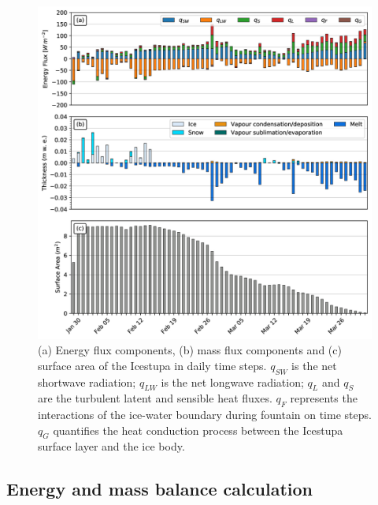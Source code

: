 \documentclass[utf8]{frontiersSCNS} %
\begin{document}
  \begin{figure} \begin{center}
  \includegraphics[width=\linewidth]{Figures/Figure_6.jpg} \end{center}
  \caption{(a) Energy flux components, (b) mass flux components and (c)
  surface area of the Icestupa in daily time steps. $q_{SW}$ is the net
shortwave radiation; $q_{LW}$ is the net longwave radiation; $q_{L}$ and
$q_{S}$ are the turbulent latent and sensible heat fluxes. $q_{F}$ represents
the interactions of the ice-water boundary during fountain on time steps.
$q_{G}$ quantifies the heat conduction process between the Icestupa surface
layer and the ice body. } \label{fig:EB} \end{figure}
  

\subsection{Energy and mass balance calculation}
\end{document}
